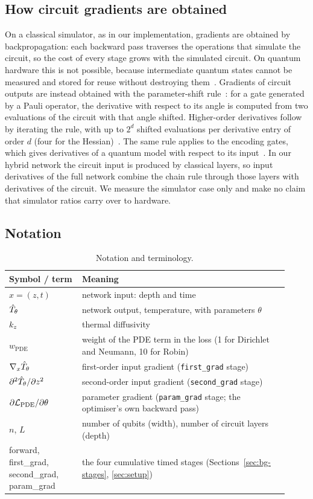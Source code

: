 \subsection{How circuit gradients are obtained}
\label{sec:bg-grads}
On a classical simulator, as in our implementation, gradients are obtained by backpropagation: each backward
pass traverses the operations that simulate the circuit, so the cost of every stage grows with the simulated
circuit. On quantum hardware this is not possible, because intermediate quantum states cannot be measured and
stored for reuse without destroying them~\cite{schuld2019}. Gradients of circuit outputs are instead obtained
with the parameter-shift rule~\cite{mitarai2018,schuld2019}: for a gate generated by a Pauli operator, the
derivative with respect to its angle is computed from two evaluations of the circuit with that angle shifted.
Higher-order derivatives follow by iterating the rule, with up to $2^d$ shifted evaluations per derivative
entry of order $d$ (four for the Hessian)~\cite{mari2021}. The same rule applies to the encoding gates,
which gives derivatives of a quantum model with respect to its input~\cite{kyriienko2021}. In our hybrid network
the circuit input is produced by classical layers, so input derivatives of the full network combine the chain
rule through those layers with derivatives of the circuit.
We measure the simulator case only and make no claim that simulator ratios carry over to hardware.

\subsection{Notation}
\begin{table}[h]
\centering
\caption{Notation and terminology.}
\label{tab:notation}
\small
\begin{tabular}{@{}p{0.24\linewidth} p{0.68\linewidth}@{}}
\toprule
Symbol / term & Meaning \\
\midrule
$x=(z,t)$ & network input: depth and time \\
$\hat T_\theta$ & network output, temperature, with parameters $\theta$ \\
$k_z$ & thermal diffusivity \\
$w_{\text{PDE}}$ & weight of the PDE term in the loss (1 for Dirichlet and Neumann, 10 for Robin) \\
$\nabla_x\hat T_\theta$ & first-order input gradient (\texttt{first\_grad} stage) \\
$\partial^2\hat T_\theta/\partial z^2$ & second-order input gradient (\texttt{second\_grad} stage) \\
$\partial\mathcal{L}_{\text{PDE}}/\partial\theta$ & parameter gradient (\texttt{param\_grad} stage; the optimiser's own backward pass) \\
$n$, $L$ & number of qubits (width), number of circuit layers (depth) \\
forward, first\_grad, second\_grad, param\_grad & the four cumulative timed stages (Sections~\ref{sec:bg-stages}, \ref{sec:setup}) \\
\bottomrule
\end{tabular}
\end{table}
